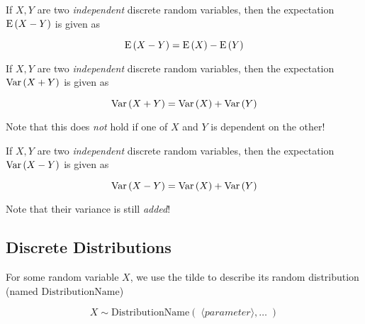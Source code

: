 \begin{definition}
    If $X, Y$ are two \textit{independent} discrete random variables, then the expectation $\mathrm{E} \left( X - Y \right)$ is given as
    
    \begin{equation}
        \mathrm{E} \left( X - Y \right) = \mathrm{E} \left( X \right) - \mathrm{E} \left( Y \right)
    \end{equation}
\end{definition}

\begin{definition}
    If $X, Y$ are two \textit{independent} discrete random variables, then the expectation $\mathrm{Var} \left( X + Y \right)$ is given as
    
    \begin{equation}
        \mathrm{Var} \left( X + Y \right) = \mathrm{Var} \left( X \right) + \mathrm{Var} \left( Y \right)
    \end{equation}
    
    Note that this does \textit{not} hold if one of $X$ and $Y$ is dependent on the other!
\end{definition}

\begin{definition}
    If $X, Y$ are two \textit{independent} discrete random variables, then the expectation $\mathrm{Var} \left( X - Y \right)$ is given as
    
    \begin{equation}
        \mathrm{Var} \left( X - Y \right) = \mathrm{Var} \left( X \right) + \mathrm{Var} \left( Y \right)
    \end{equation}
    
    Note that their variance is still \textit{added}!
\end{definition}

\subsection{Discrete Distributions}

\begin{definition}
    For some random variable $X$, we use the tilde to describe its random distribution (named $\mathrm{DistributionName}$)
    
    \begin{equation}
        X \sim \mathrm{DistributionName}(\; \langle \mathit{parameter} \rangle, \dots \;)
    \end{equation}
\end{definition}

